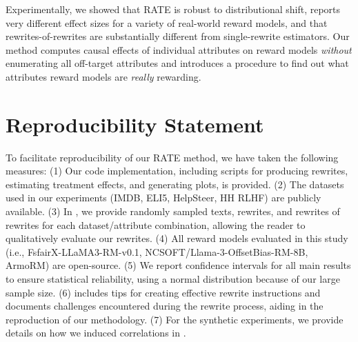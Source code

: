 \documentclass{article}
\begin{document}
Experimentally, we showed that RATE is robust to distributional shift, reports very different effect sizes for a variety of real-world reward models, and that rewrites-of-rewrites are substantially different from single-rewrite estimators. Our method computes causal effects of individual attributes on reward models \emph{without} enumerating all off-target attributes and introduces a procedure to find out what attributes reward models are \emph{really} rewarding.

\section*{Reproducibility Statement}
To facilitate reproducibility of our RATE method, we have taken the following measures: (1) Our code implementation, including scripts for producing rewrites, estimating treatment effects, and generating plots, is provided.
(2) The datasets used in our experiments (IMDB, ELI5, HelpSteer, HH RLHF) are publicly available. (3) In , we provide randomly sampled texts, rewrites, and rewrites of rewrites for each dataset/attribute combination, allowing the reader to qualitatively evaluate our rewrites. (4) All reward models evaluated in this study (i.e., FsfairX-LLaMA3-RM-v0.1, NCSOFT/Llama-3-OffsetBias-RM-8B, ArmoRM) are open-source. (5) We report confidence intervals for all main results to ensure statistical reliability, using a normal distribution because of our large sample size. (6)  includes tips for creating effective rewrite instructions and documents challenges encountered during the rewrite process, aiding in the reproduction of our methodology. (7) For the synthetic experiments, we provide details on how we induced correlations in .




\end{document}
